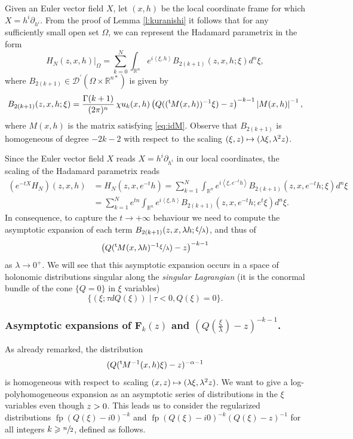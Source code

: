 \documentclass[JEP,XML,SOM,Unicode]{cedram}
\let\pazocal\mathscr
\def\mto{\mathchoice{\longmapsto}{\mapsto}{\mapsto}{\mapsto}}
\theoremstyle{definition}
\let\cv\alpha
\let\st\mid
\let\euler X
\let\Im\relax
\DeclareMathOperator{\Im}{Im}
\DeclareMathOperator*{\pf}{fp}
\newcommand{\module}[1]{\left|#1\right|}
\renewcommand{\t}{{{}^{\mathrm{t}\mkern-2mu}}}
\begin{document}
Given an Euler vector field $\euler$, let $(x,h)$ be the local coordinate
frame for which $\euler=h^i\partial_{h^i}$. From the proof of Lemma \ref{l:kuranishi} it follows that for any sufficiently small open set $\Omega$, we can represent the Hadamard parametrix in the form
\[
H_N(z,x,h)|_\Omega= \sum_{k=0}^N \int_{\mathbb{R}^n} e^{i\left\langle\xi,h\right\rangle} B_{2(k+1)}(z,x,h;\xi) d^n\xi,
\]
where $B_{2(k+1)}\in \pazocal{D}^\prime(\Omega\times \mathbb{R}^{n*})$ is given by
\begin{equation*}%
B_{2(k+1)}(z,x,h;\xi)=\frac{\Gamma(k+1)}{(2\pi)^{n}}\,\chi u_k(x,h) \left(Q((\t M(x,h))^{-1}\xi)-z \right)^{-k-1} \module{M(x,h)}^{-1},
\end{equation*}
where $M(x,h)$ is the matrix satisfying \eqref{eq:idM}. Observe that $B_{2(k+1)}$ is homogeneous of degree $-2k-2$ with respect to~the scaling
$ (\xi,z) \mto (\lambda\xi,\lambda^2z)$.

Since the Euler vector field $\euler$ reads
$\euler=h^i\partial_{h^i}$ in our local coordinates, the scaling of the Hadamard parametrix reads
\[
\begin{aligned}
{\left(e^{-t\euler} H_N\right)}(z,x,h)&=H_N(z,x,e^{-t}h)=
\sum_{k=1}^N \int_{\mathbb{R}^n} e^{i\left\langle\xi,e^{-t}h\right\rangle} B_{2(k+1)}(z,x,e^{-t}h;\xi) d^n\xi\\
&=\sum_{k=1}^N e^{tn} \int_{\mathbb{R}^n} e^{i\left\langle\xi,h\right\rangle} B_{2(k+1)}(z,x,e^{-t}h;e^{t}\xi) d^n\xi.
\end{aligned}
\]
In consequence, to capture the $t\to+\infty$ behaviour we need to compute the asymptotic expansion of
each term $ B_{2(k+1)}(z,x,\lambda h;\sfrac{\xi}{\lambda})$,
and thus of
\[
\big(Q(\t M(x,\lambda h)^{-1}\sfrac{\xi}{\lambda})-z\big)^{-k-1}
\]
as $\lambda\to 0^+$. We will see that this asymptotic expansion
occurs in a space of holonomic distributions singular along
the \emph{singular Lagrangian} (it is the conormal bundle of the cone $\{Q=0\}$ in $\xi$ variables)
\[
\{(\xi;\tau dQ(\xi)) \st \tau<0, Q(\xi)=0 \}.
\]

\subsubsection{Asymptotic expansions of $\mathbf{F}_k(z)$ and $(Q(\frac{\xi}{\lambda})-z)^{-k-1}$.} As already remarked,
the distribution
\[
(Q(\t M^{-1}(x,h) \xi)-z)^{-\cv-1}
\]
is homogeneous with respect to~scaling
$(x,z)\mto(\lambda\xi,\lambda^2z) $. We want to give a log-polyhomogeneous expansion as an asymptotic series of
distributions in the $\xi$ variables even though $\Im z>0$.
This leads us to consider the regularized distributions
\hbox{$\pf (Q(\xi)-i0)^{-k}$} and $\pf (Q(\xi)-i0)^{-k} (Q(\xi)-z)^{-1}$ for all integers $k\geqslant \sfrac{n}{2}$, defined as follows.
\end{document}
